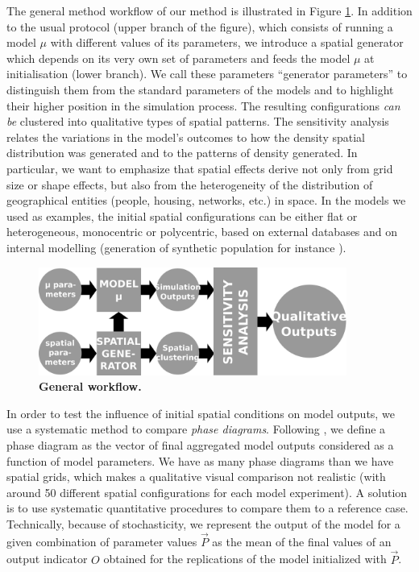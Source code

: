 \documentclass{JASSS}
\begin{document}
The general method workflow of our method is illustrated in Figure \ref{fig:method}. In addition to the usual protocol (upper branch of the figure), which consists of running a model $\mu$ with different values of its parameters, we introduce a spatial generator which depends on its very own set of parameters and feeds the model $\mu$ at initialisation (lower branch). We call these parameters ``generator parameters'' to distinguish them from the standard parameters of the models and to highlight their higher position in the simulation process. The resulting configurations \emph{can be} clustered into qualitative types of spatial patterns. The sensitivity analysis relates the variations in the model's outcomes to how the density spatial distribution was generated and to the patterns of density generated. In particular, we want to emphasize that spatial effects derive not only from grid size or shape effects, but also from the heterogeneity of the distribution of geographical entities (people, housing, networks, etc.) in space. In the models we used as examples, the initial spatial configurations can be either flat or heterogeneous, monocentric or polycentric, based on external databases and on internal modelling (generation of synthetic population for instance \citep{bhat1999activity}).
\begin{figure}[!t]
\centering
\includegraphics[width=0.9\textwidth]{figures/Fig1.png}
\caption{\textbf{General workflow.}} \label{fig:method}
\end{figure} %


In order to test the influence of initial spatial conditions on model outputs, we use a systematic method to compare \emph{phase diagrams}. Following \citet{Gauvinetal2009}, we define a phase diagram as the vector of final aggregated model outputs considered as a function of model parameters. We have as many phase diagrams than we have spatial grids, which makes a qualitative visual comparison not realistic (with around 50 different spatial configurations for each model experiment). A solution is to use systematic quantitative procedures to compare them to a reference case. Technically, because of stochasticity, we represent the output of the model for a given combination of parameter values $\vec{P}$ as the mean of the final values of an output indicator $O$ obtained for the replications of the model initialized with $\vec{P}$.\\
\end{document}
